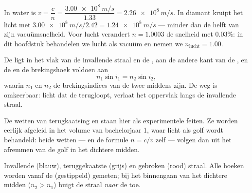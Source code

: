 \begin{example}\label{ex:g10:refraction:speed}
In water is $v = \dfrac{c}{n} = \dfrac{\qty{3.00e8}{m/s}}{1.33}
= \qty{2.26e8}{m/s}$. In diamant kruipt het licht met
$\qty{3.00e8}{m/s}/2.42 = \qty{1.24e8}{m/s}$ --- minder dan de helft van
zijn vacuümsnelheid. Voor lucht verandert $n = 1.0003$ de snelheid met
$0.03\%$: in dit hoofdstuk behandelen we lucht als vacuüm en nemen we
$n_{\text{lucht}} = 1.00$.
\end{example}

\begin{theorem}\label{thm:g10:refraction:snell}
De  ligt in het vlak van de invallende straal en de
, aan de andere kant van de , en de  en de
brekingshoek voldoen aan
\[
n_1 \sin i_1 = n_2 \sin i_2 ,
\]
waarin $n_1$ en $n_2$ de brekingsindices van de twee middens zijn. De weg
is omkeerbaar: licht dat de  terugloopt, verlaat het
oppervlak langs de invallende straal.
\end{theorem}
\admitted

\begin{remark}\label{rem:g10:refraction:honest}
De wetten van terugkaatsing en  staan hier als experimentele
feiten. Ze worden eerlijk afgeleid in het volume van bachelorjaar 1,
waar licht als golf wordt behandeld: beide wetten --- en de formule
$n = c/v$ zelf --- volgen dan uit het afremmen van de golf in het
dichtere midden.
\end{remark}

\begin{omfigure}

{\small Invallende (blauw), teruggekaatste (grijs) en gebroken (rood)
straal. Alle hoeken worden vanaf de  (gestippeld) gemeten; bij het
binnengaan van het dichtere midden ($n_2 > n_1$) buigt de straal
\emph{naar} de  toe.}
\end{omfigure}

